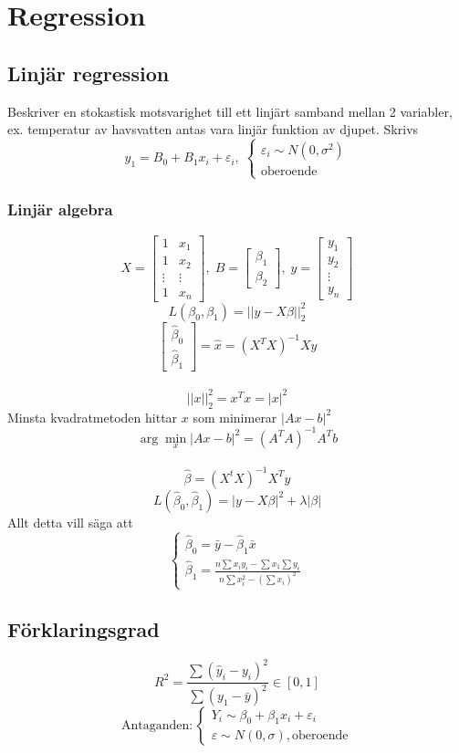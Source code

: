 \chapter{Regression}
\section{Linjär regression}
Beskriver en stokastisk motsvarighet till ett linjärt samband mellan 2 variabler, ex. temperatur av havsvatten antas vara linjär funktion av djupet.
Skrivs $$
	y_1=B_0+B_1x_i+\varepsilon_i,\;\begin{cases}
		\varepsilon_i\sim N(0,\sigma^2) \\
		\text{oberoende}
	\end{cases}
$$
\subsection{Linjär algebra}
$$
	X=\begin{bmatrix}
		1      & x_1    \\
		1      & x_2    \\
		\vdots & \vdots \\
		1      & x_n
	\end{bmatrix},\;B=\begin{bmatrix}
		\beta_1 \\
		\beta_2
	\end{bmatrix},\;y=\begin{bmatrix}
		y_1    \\
		y_2    \\
		\vdots \\
		y_n
	\end{bmatrix}
$$$$
	L(\beta_0,\beta_1)=||y-X\beta||^2_2
$$$$
	\begin{bmatrix}
		\hat\beta_0 \\
		\hat\beta_1
	\end{bmatrix}=\hat{x}=(X^TX)^{-1}Xy
$$~\\$$
	||x||^2_2=x^Tx=|x|^2
$$
Minsta kvadratmetoden hittar $x$ som minimerar $|Ax-b|^2$
$$
	\arg\min_x|Ax-b|^2=(A^TA)^{-1}A^Tb
$$~\\
$$
	\hat\beta=(X^tX)^{-1}X^Ty
$$
$$L(\hat\beta_0,\hat\beta_1)=|y-X\beta|^2+\lambda|\beta|$$
Allt detta vill säga att $$
	\begin{cases}
		\hat\beta_0=\bar y-\hat\beta_1\bar x \\
		\hat\beta_1=\frac{n\sum x_iy_i-\sum x_1\sum y_i}{n\sum x_i^2-(\sum x_i)^2}
	\end{cases}
$$
\section{Förklaringsgrad}
$$
	R^2=\frac{\sum(\hat y_i-y_i)^2}{\sum(y_1-\bar y)^2}\in[0,1]
$$
$$
	\text{Antaganden}:\begin{cases}
		Y_i\sim\beta_0+\beta_1x_i+\varepsilon_i \\
		\varepsilon\sim N(0,\sigma),\text{oberoende}
	\end{cases}
$$